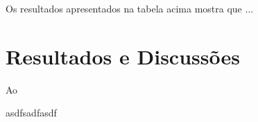 \documentclass[12pt, twocolumn, a4paper]{article}
\begin{document}
	
Os resultados apresentados na tabela acima mostra que ...
	
	
	\section{Resultados e Discussões}
	
Ao 



asdfsadfasdf

  
	
	
	
\end{document}
